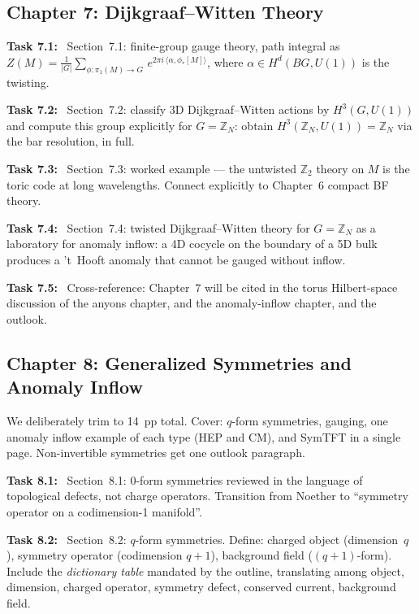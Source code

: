 \documentclass[11pt]{article}
\newcommand{\task}[1]{\medskip\noindent\textbf{Task #1:}\ }
\begin{document}
\subsection{Chapter 7: Dijkgraaf--Witten Theory}

\task{7.1} Section~7.1: finite-group gauge theory, path integral as
$Z(M) = \frac{1}{|G|}\sum_{\phi:\pi_1(M)\to G}\,e^{2\pi i\,\langle\alpha,\phi_*[M]\rangle}$,
where $\alpha\in H^d(BG,U(1))$ is the twisting.

\task{7.2} Section~7.2: classify 3D Dijkgraaf--Witten actions by $H^3(G,U(1))$ and
compute this group explicitly for $G=\mathbb{Z}_N$: obtain $H^3(\mathbb{Z}_N,U(1))=\mathbb{Z}_N$
via the bar resolution, in full.

\task{7.3} Section~7.3: worked example --- the untwisted $\mathbb{Z}_2$ theory on $M$ is
the toric code at long wavelengths. Connect explicitly to Chapter~6 compact BF theory.

\task{7.4} Section~7.4: twisted Dijkgraaf--Witten theory for $G=\mathbb{Z}_N$ as a
laboratory for anomaly inflow: a 4D cocycle on the boundary of a 5D bulk produces
a 't~Hooft anomaly that cannot be gauged without inflow.

\task{7.5} Cross-reference: Chapter~7 will be cited in the torus Hilbert-space
discussion of the anyons chapter, and the anomaly-inflow chapter, and the outlook.

\subsection{Chapter 8: Generalized Symmetries and Anomaly Inflow}

\begin{insight}
We deliberately trim to 14~pp total. Cover: $q$-form symmetries, gauging, one anomaly
inflow example of each type (HEP and CM), and SymTFT in a single page. Non-invertible
symmetries get one outlook paragraph.
\end{insight}

\task{8.1} Section~8.1: 0-form symmetries reviewed in the language of topological
defects, not charge operators. Transition from Noether to ``symmetry operator on a
codimension-1 manifold''.

\task{8.2} Section~8.2: $q$-form symmetries. Define: charged object (dimension~$q$),
symmetry operator (codimension $q+1$), background field ($(q+1)$-form). Include the
\emph{dictionary table} mandated by the outline, translating among object, dimension,
charged operator, symmetry defect, conserved current, background field.
\end{document}
